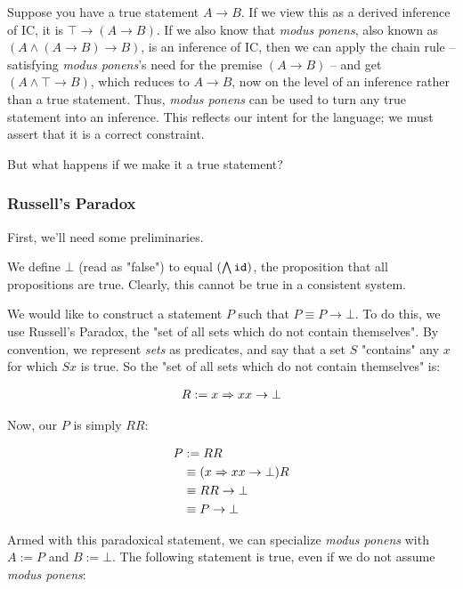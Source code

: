 \documentclass{article}
\begin{document}
  Suppose you have a true statement $A \to B$. If we view this as a derived inference of IC, it is $\top \to (A \to B)$. If we also know that \emph{modus ponens}, also known as $(A \wedge (A \to B) \to B)$, is an inference of IC, then we can apply the chain rule – satisfying \emph{modus ponens}'s need for the premise $(A \to B)$ – and get $(A \wedge \top \to B)$, which reduces to $A \to B$, now on the level of an inference rather than a true statement. Thus, \emph{modus ponens} can be used to turn any true statement into an inference. This reflects our intent for the language; we must assert that it is a correct constraint.
  
  But what happens if we make it a true statement?
  
  \subsubsection{Russell's Paradox}
  
  First, we'll need some preliminaries.
  
  We define $\bot$ (read as "false") to equal $(\bigwedge \operatorname{\texttt{id}})$, the proposition that all propositions are true. Clearly, this cannot be true in a consistent system.
  
  We would like to construct a statement $P$ such that $P \equiv P \to \bot$. To do this, we use Russell's Paradox, the "set of all sets which do not contain themselves". By convention, we represent \emph{sets} as predicates, and say that a set $S$ "contains" any $x$ for which $S x$ is true. So the "set of all sets which do not contain themselves" is:
  
  \begin{align*}
    R := x \Rightarrow x x \to \bot
  \end{align*}
  
  Now, our $P$ is simply $RR$:
  
  \begin{align*}
    P &:= RR\\
      &\equiv (x \Rightarrow x x \to \bot)R\\
      &\equiv RR \to \bot\\
      &\equiv P \to \bot\\
  \end{align*}
  
  Armed with this paradoxical statement, we can specialize \emph{modus ponens} with $A := P$ and $B := \bot$. The following statement is true, even if we do not assume \emph{modus ponens}:
  
\end{document}
